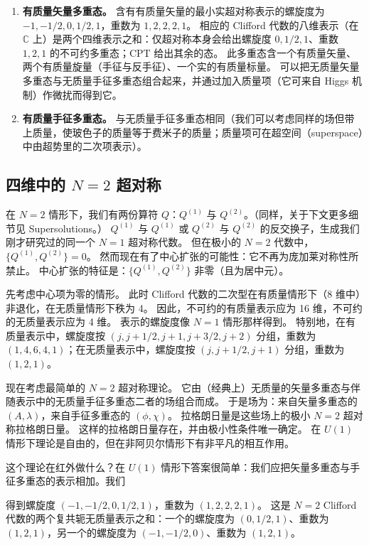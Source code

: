 \begin{enumerate}
\item \textbf{有质量矢量多重态。}
  含有有质量矢量的最小实超对称表示的螺旋度为 $-1,-1/2,0,1/2,1$，重数为 $1,2,2,2,1$。
  相应的 Clifford 代数的八维表示（在 $\mathbb{C}$ 上）是两个四维表示之和：仅超对称本身会给出螺旋度 $0,1/2,1$、重数 $1,2,1$ 的不可约多重态；CPT 给出其余的态。
  此多重态含一个有质量矢量、两个有质量旋量（手征与反手征）、一个实的有质量标量。
  可以把无质量矢量多重态与无质量手征多重态组合起来，并通过加入质量项（它可来自 Higgs 机制）作微扰而得到它。
\item \textbf{有质量手征多重态。}
  与无质量手征多重态相同（我们可以考虑同样的场但带上质量，使玻色子的质量等于费米子的质量；质量项可在超空间（superspace）中由超势里的二次项表示）。
\end{enumerate}

\subsection{四维中的 $N=2$ 超对称}

在 $N=2$ 情形下，我们有两份算符 $Q$：$Q^{(1)}$ 与 $Q^{(2)}$。（同样，关于下文更多细节见 Supersolutions。）
$Q^{(1)}$ 与 $Q^{(1)}$ 或 $Q^{(2)}$ 与 $Q^{(2)}$ 的反交换子，生成我们刚才研究过的同一个 $N=1$ 超对称代数。
但在极小的 $N=2$ 代数中，$\{Q^{(1)},Q^{(2)}\}=0$。
然而现在有了中心扩张的可能性：它不再为庞加莱对称性所禁止。
中心扩张的特征是：$\{Q^{(1)},Q^{(2)}\}$ 非零（且为居中元）。

先考虑中心项为零的情形。
此时 Clifford 代数的二次型在有质量情形下（8 维中）非退化，在无质量情形下秩为 4。
因此，不可约的有质量表示应为 16 维，不可约的无质量表示应为 4 维。
表示的螺旋度像 $N=1$ 情形那样得到。
特别地，在有质量表示中，螺旋度按 $(j,j+1/2,j+1,j+3/2,j+2)$ 分组，重数为 $(1,4,6,4,1)$；在无质量表示中，螺旋度按 $(j,j+1/2,j+1)$ 分组，重数为 $(1,2,1)$。

现在考虑最简单的 $N=2$ 超对称理论。
它由（经典上）无质量的矢量多重态与伴随表示中的无质量手征多重态二者的场组合而成。
于是场为：来自矢量多重态的 $(A,\lambda)$，来自手征多重态的 $(\phi,\chi)$。
拉格朗日量是这些场上的极小 $N=2$ 超对称拉格朗日量。
这样的拉格朗日量存在，并由极小性条件唯一确定。
在 $U(1)$ 情形下理论是自由的，但在非阿贝尔情形下有非平凡的相互作用。

这个理论在红外做什么？在 $U(1)$ 情形下答案很简单：我们应把矢量多重态与手征多重态的表示相加。我们

得到螺旋度 $(-1,-1/2,0,1/2,1)$，重数为 $(1,2,2,2,1)$。
这是 $N=2$ Clifford 代数的两个复共轭无质量表示之和：一个的螺旋度为 $(0,1/2,1)$、重数为 $(1,2,1)$，另一个的螺旋度为 $(-1,-1/2,0)$、重数为 $(1,2,1)$。

